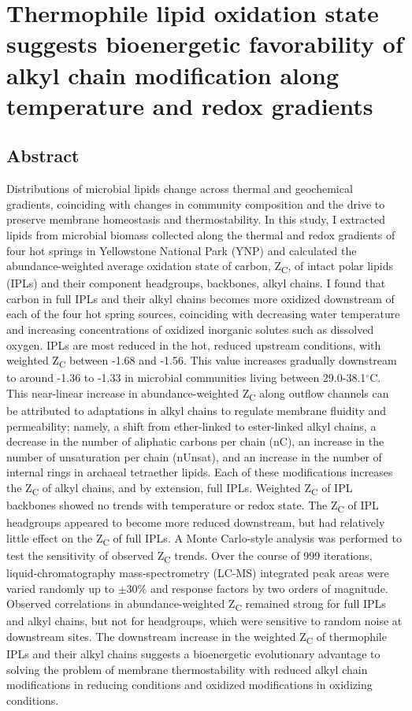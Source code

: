 \chapter[THERMOPHILE LIPID OXIDATION STATE SUGGESTS BIOENERGETIC FAVORABILITY OF ALKYL CHAIN MODIFICATION ALONG TEMPERATURE AND REDOX GRADIENTS]{Thermophile lipid oxidation state suggests bioenergetic favorability of alkyl chain modification along temperature and redox gradients}\label{ch1}

\section{Abstract}
Distributions of microbial lipids change across thermal and geochemical gradients, coinciding with changes in community composition and the drive to preserve membrane homeostasis and thermostability. In this study, I extracted lipids from microbial biomass collected along the thermal and redox gradients of four hot springs in Yellowstone National Park (YNP) and calculated the abundance-weighted average oxidation state of carbon, Z\textsubscript{C}, of intact polar lipids (IPLs) and their component headgroups, backbones, alkyl chains. I found that carbon in full IPLs and their alkyl chains becomes more oxidized downstream of each of the four hot spring sources, coinciding with decreasing water temperature and increasing concentrations of oxidized inorganic solutes such as dissolved oxygen. IPLs are most reduced in the hot, reduced upstream conditions, with weighted Z\textsubscript{C} between -1.68 and -1.56. This value increases gradually downstream to around -1.36 to -1.33 in microbial communities living between 29.0-38.1$^\circ$C. This near-linear increase in abundance-weighted Z\textsubscript{C} along outflow channels can be attributed to adaptations in alkyl chains to regulate membrane fluidity and permeability; namely, a shift from ether-linked to ester-linked alkyl chains, a decrease in the number of aliphatic carbons per chain (nC), an increase in the number of unsaturation per chain (nUnsat), and an increase in the number of internal rings in archaeal tetraether lipids. Each of these modifications increases the Z\textsubscript{C} of alkyl chains, and by extension, full IPLs. Weighted Z\textsubscript{C} of IPL backbones showed no trends with temperature or redox state. The Z\textsubscript{C} of IPL headgroups appeared to become more reduced downstream, but had relatively little effect on the Z\textsubscript{C} of full IPLs. A Monte Carlo-style analysis was performed to test the sensitivity of observed Z\textsubscript{C} trends. Over the course of 999 iterations, liquid-chromatography mass-spectrometry (LC-MS) integrated peak areas were varied randomly up to $\pm$30\% and response factors by two orders of magnitude. Observed correlations in abundance-weighted Z\textsubscript{C} remained strong for full IPLs and alkyl chains, but not for headgroups, which were sensitive to random noise at downstream sites. The downstream increase in the weighted Z\textsubscript{C} of thermophile IPLs and their alkyl chains suggests a bioenergetic evolutionary advantage to solving the problem of membrane thermostability with reduced alkyl chain modifications in reducing conditions and oxidized modifications in oxidizing conditions.

